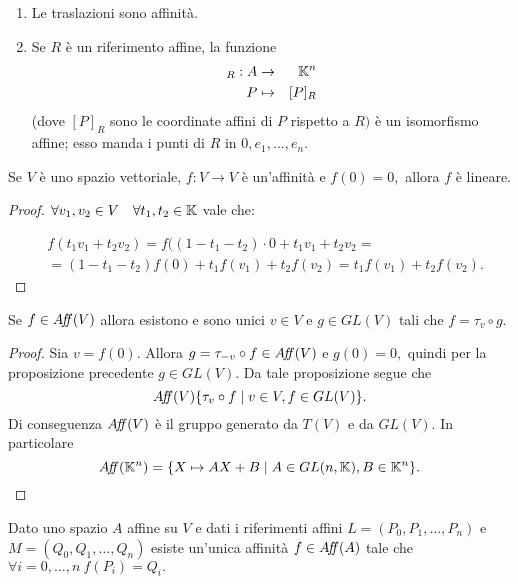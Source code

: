 \begin{example}
 \begin{enumerate}[label=\bf\Roman*)]
  \item Le traslazioni sono affinità.
  \item Se $R$ è un riferimento affine, la funzione
   \begin{eqnarray*}
  [\quad]_R:A & \to & \K^n \\
  P & \mapsto & [P]_R
 \end{eqnarray*}
  (dove $[P]_R$ sono le coordinate affini di $P$ rispetto a $R)$ è un isomorfismo affine;
 esso manda i punti di $R$ in $0,e_1,\ldots,e_n.$
 \end{enumerate}
 \end{example}
 
 \begin{proposition}
 Se $V$ è uno spazio vettoriale, $f:V\to V$ è un'affinità e $f(0)=0,$ allora
 $f$ è lineare.
 \end{proposition}
 \begin{proof}
 $\forall v_1,v_2\in V\quad\forall t_1,t_2\in \mathbb K$ vale che:
 
 \begin{eqnarray*}
	& f(t_1v_1+t_2v_2)=f((1-t_1-t_2)\cdotp 0+t_1v_1+t_2v_2=\\
	& =(1-t_1-t_2)f(0)+t_1f(v_1)+t_2f(v_2)=t_1f(v_1)+t_2f(v_2).
 \end{eqnarray*}
 \end{proof}
 
 \begin{proposition}
 Se $f\in A\!f\!\!f(V)$ allora esistono e sono unici $v\in V$ e $g\in GL(V)$ tali che
 $f=\tau_v\circ g.$
 \end{proposition}
 
 \begin{proof}
 Sia $v=f(0).$ Allora $g=\tau_{-v}\circ f\in A\!f\!\!f(V)$ e $g(0)=0,$
 quindi per la proposizione precedente $g\in GL(V).$
 Da tale proposizione segue che 
 \[
	A\!f\!\!f(V)\{\tau_v\circ f\;|\;v\in V,f\in GL(V)\}.
 \]
 Di conseguenza $A\!f\!\!f(V)$ è il gruppo generato da $T(V)$ e da $GL(V).$
 In particolare 
 \[
	A\!f\!\!f(\mathbb K^n)=\{X\mapsto AX+B \; |\; A\in GL(n,\mathbb K),B\in \mathbb K^n\}.
 \]
 \end{proof}
 
\begin{proposition}
Dato uno spazio $A$ affine su $V$ e dati i riferimenti affini $L=(P_0,P_1,\ldots,P_n)$
 e $M=(Q_0,Q_1,\ldots,Q_n)$ esiste un'unica affinità $f\in A\!f\!\!f(A)$ tale che
 $\forall i=0,\ldots,n\ f(P_i)=Q_i.$
 \end{proposition}
 
